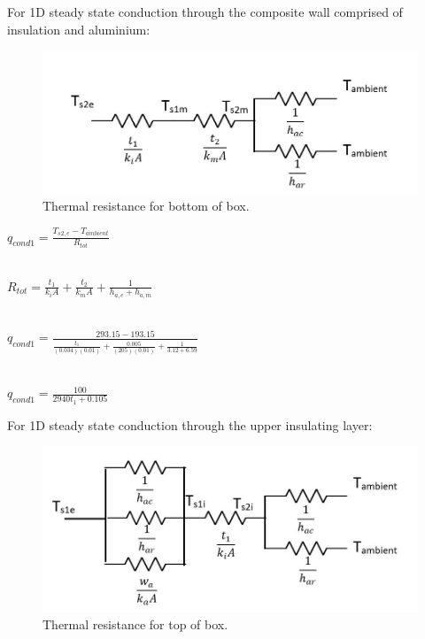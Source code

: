 For 1D steady state conduction through the composite wall comprised of insulation and aluminium: \\

	\begin{figure}[h!]
    \centering
    \includegraphics[scale=0.6]{4-experiment-design/img/mechanical/thermalresistance1.JPG}
	\caption{Thermal resistance for bottom of box.}
	\label{fig:thermalresistance1}
	\end{figure}

\begin{center}
 $q_{cond1} = \frac{T_{s2,e}-T_{ambient}}{R_{tot}} $\\
 
 \ 
 
 $R_{tot} = \frac{t_{1}}{k_{i}A} + \frac{t_{2}}{k_{m}A} + \frac{1}{h_{a,e}+h_{a,m}} $\\
 
 \
 \ 
 
 $q_{cond1} = \frac{293.15 - 193.15}{\frac{t_{1}}{(0.034)(0.01)} + \frac{0.005}{(205)(0.01)} + \frac{1}{3.12+6.59}} $\\
 
 \  
 \ 
 
 $q_{cond1} = \frac{100}{2940t_{1}+0.105} $\\
 
\end{center}
 

For 1D steady state conduction through the upper insulating layer: \\

	\begin{figure}[h!]
    \centering
    \includegraphics[scale=0.6]{4-experiment-design/img/mechanical/thermalresistance2.JPG}
	\caption{Thermal resistance for top of box.}
	\label{fig:thermalresistance2}
	\end{figure} 

